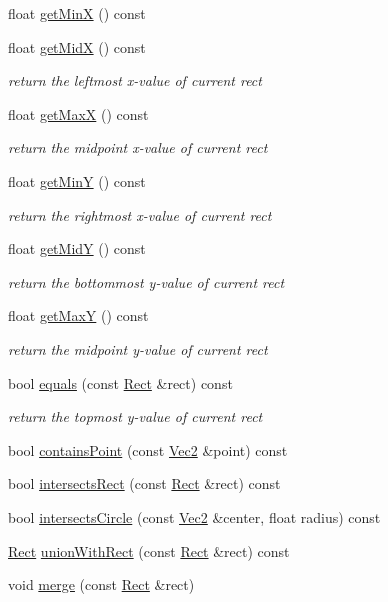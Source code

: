 \begin{DoxyCompactItemize}
float \hyperlink{classRect_aeb245e3c08e311b8d6cf7ca0ab5b71e5}{get\+MinX} () const
\item 
float \hyperlink{classRect_a0d644f512a90863b28d73c445113702b}{get\+MidX} () const
\begin{DoxyCompactList}\small\item\em return the leftmost x-\/value of current rect \end{DoxyCompactList}\item 
float \hyperlink{classRect_a12e69431d11ad75d3cee64e6809325c8}{get\+MaxX} () const
\begin{DoxyCompactList}\small\item\em return the midpoint x-\/value of current rect \end{DoxyCompactList}\item 
float \hyperlink{classRect_abe95583121eb9041bd9dcedbebbdb704}{get\+MinY} () const
\begin{DoxyCompactList}\small\item\em return the rightmost x-\/value of current rect \end{DoxyCompactList}\item 
float \hyperlink{classRect_a7454d7f94e0903740ed119f1cb780733}{get\+MidY} () const
\begin{DoxyCompactList}\small\item\em return the bottommost y-\/value of current rect \end{DoxyCompactList}\item 
float \hyperlink{classRect_ae508fa245f49f5cc691d2dc36fdd7a8c}{get\+MaxY} () const
\begin{DoxyCompactList}\small\item\em return the midpoint y-\/value of current rect \end{DoxyCompactList}\item 
bool \hyperlink{classRect_af18d9c2a452430601e398fec58f4c8d3}{equals} (const \hyperlink{classRect}{Rect} \&rect) const
\begin{DoxyCompactList}\small\item\em return the topmost y-\/value of current rect \end{DoxyCompactList}\item 
bool \hyperlink{classRect_ade04c4780618c8886ab11902b92a25ec}{contains\+Point} (const \hyperlink{classVec2}{Vec2} \&point) const
\item 
bool \hyperlink{classRect_a1cda3d61f31818b138c051135c5a3bdd}{intersects\+Rect} (const \hyperlink{classRect}{Rect} \&rect) const
\item 
bool \hyperlink{classRect_a14ae2011ca780e304387920a8ebb1538}{intersects\+Circle} (const \hyperlink{classVec2}{Vec2} \&center, float radius) const
\item 
\hyperlink{classRect}{Rect} \hyperlink{classRect_ab51a6068a355a826faa0bd03c381f1fa}{union\+With\+Rect} (const \hyperlink{classRect}{Rect} \&rect) const
\item 
void \hyperlink{classRect_aafc3d3683de418f92a7089c7b7a777e0}{merge} (const \hyperlink{classRect}{Rect} \&rect)
\end{DoxyCompactItemize}
